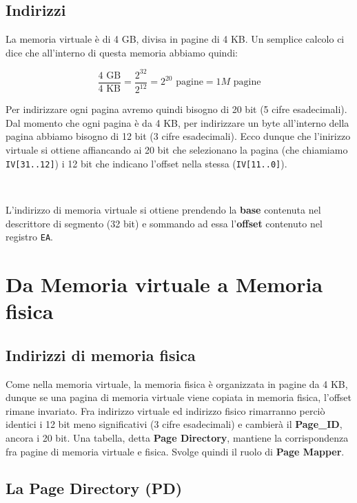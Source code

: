 \documentclass[11pt]{book}
\begin{document}
\subsection{Indirizzi}

La memoria virtuale \`e di 4 GB, divisa in pagine di 4 KB. Un semplice
calcolo ci dice che all'interno di questa memoria abbiamo quindi:

$$
\frac{4 \text{ GB}}{4 \text{ KB}} = \frac{2^{32}}{2^{12}} = 2^{20}
\text{ pagine} = 1 M \text{ pagine}
$$

Per indirizzare ogni pagina avremo quindi bisogno di 20 bit (5 cifre
esadecimali). Dal momento che ogni pagina \`e da 4 KB, per indirizzare
un byte all'interno della pagina abbiamo bisogno di 12 bit (3 cifre
esadecimali). Ecco dunque che l'inirizzo virtuale si ottiene
affiancando ai 20 bit che selezionano la pagina (che chiamiamo
\texttt{IV[31..12]}) i 12 bit che indicano l'offset nella stessa
(\texttt{IV[11..0]}).

\

L'indirizzo di memoria virtuale si ottiene prendendo la \textbf{base}
contenuta nel descrittore di segmento (32 bit) e sommando ad essa
l'\textbf{offset} contenuto nel registro \texttt{EA}.

\section{Da Memoria virtuale a Memoria fisica}

\subsection{Indirizzi di memoria fisica}

Come nella memoria virtuale, la memoria fisica \`e organizzata in
pagine da 4 KB, dunque se una pagina di memoria virtuale viene copiata
in memoria fisica, l'offset rimane invariato. Fra indirizzo virtuale
ed indirizzo fisico rimarranno perci\`o identici i 12 bit meno
significativi (3 cifre esadecimali) e cambier\`a il \textbf{Page\_ID},
ancora i 20 bit. Una tabella, detta \textbf{Page Directory}, mantiene
la corrispondenza fra pagine di memoria virtuale e fisica. Svolge
quindi il ruolo di \textbf{Page Mapper}.

\subsection{La Page Directory (PD)}
\end{document}
